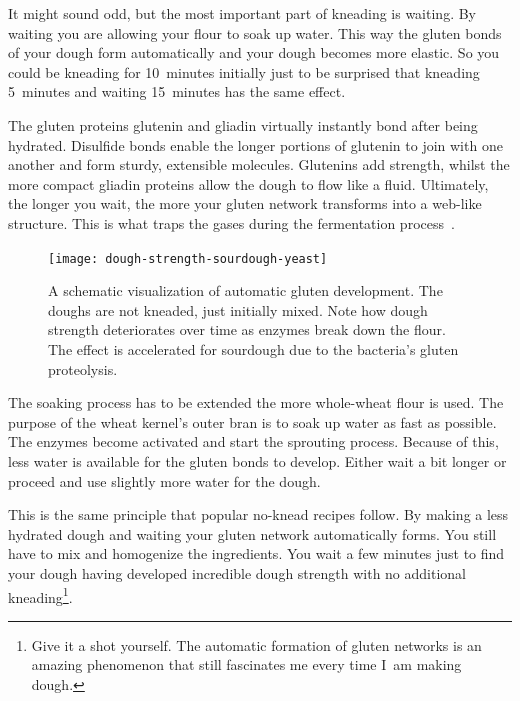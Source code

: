 It might sound odd, but the most important part of kneading is waiting. By
waiting you are allowing your flour to soak up water. This way the gluten
bonds of your dough form automatically and your dough becomes more elastic.
So you could be kneading for 10~minutes initially just to be surprised
that kneading 5~minutes and waiting 15~minutes has the same effect.

The gluten proteins glutenin and gliadin virtually instantly bond after being
hydrated. Disulfide bonds enable the longer portions of
glutenin to join with one another and form sturdy, extensible molecules.
Glutenins add strength, whilst the more compact gliadin proteins allow
the dough to flow like a fluid. Ultimately, the longer you wait, the more
your gluten network transforms into a web-like structure. This is what
traps the gases during the fermentation process~\cite{how+does+gluten+work}.

\begin{figure}[!htb]
  \texttt{[image: dough-strength-sourdough-yeast]}
  \caption[Dough strength over time without kneading]{A schematic
      visualization of automatic gluten development. The doughs are not
      kneaded, just initially mixed.  Note how dough strength deteriorates
      over time as enzymes break down the flour. The effect is accelerated for
      sourdough due to the bacteria's gluten proteolysis.}%
  \label{fig:wheat-yeast-sourdough-degradation}
\end{figure}

The soaking process has to be extended the more whole-wheat flour is used.
The purpose of the wheat kernel's outer bran is to soak up water as fast
as possible. The enzymes become activated and start the sprouting process.
Because of this, less water is available for the gluten bonds to develop.
Either wait a bit longer or proceed and use slightly more water for
the dough.

This is the same principle that popular no-knead recipes follow. By making a less
hydrated dough and waiting your gluten network automatically forms. You still
have to mix and homogenize the ingredients. You wait a few minutes just to
find your dough having developed incredible dough strength with no additional
kneading\footnote{Give it a shot yourself. The automatic formation of gluten
networks is an amazing phenomenon that still fascinates me every time I~am
making dough.}.

